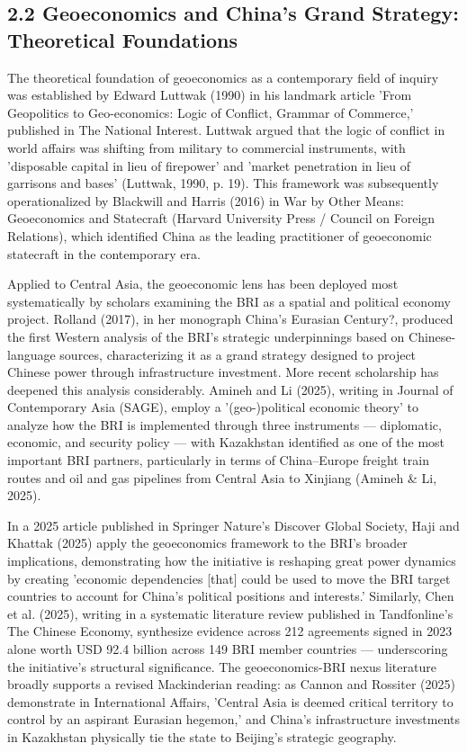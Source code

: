 \documentclass[12pt]{article}
\begin{document}
\subsection{2.2 Geoeconomics and China's Grand Strategy: Theoretical Foundations}
The theoretical foundation of geoeconomics as a contemporary field of inquiry was established by Edward Luttwak (1990) in his landmark article 'From Geopolitics to Geo-economics: Logic of Conflict, Grammar of Commerce,' published in The National Interest. Luttwak argued that the logic of conflict in world affairs was shifting from military to commercial instruments, with 'disposable capital in lieu of firepower' and 'market penetration in lieu of garrisons and bases' (Luttwak, 1990, p. 19). This framework was subsequently operationalized by Blackwill and Harris (2016) in War by Other Means: Geoeconomics and Statecraft (Harvard University Press / Council on Foreign Relations), which identified China as the leading practitioner of geoeconomic statecraft in the contemporary era.\par
Applied to Central Asia, the geoeconomic lens has been deployed most systematically by scholars examining the BRI as a spatial and political economy project. Rolland (2017), in her monograph China's Eurasian Century?, produced the first Western analysis of the BRI's strategic underpinnings based on Chinese-language sources, characterizing it as a grand strategy designed to project Chinese power through infrastructure investment. More recent scholarship has deepened this analysis considerably. Amineh and Li (2025), writing in Journal of Contemporary Asia (SAGE), employ a '(geo-)political economic theory' to analyze how the BRI is implemented through three instruments --- diplomatic, economic, and security policy --- with Kazakhstan identified as one of the most important BRI partners, particularly in terms of China--Europe freight train routes and oil and gas pipelines from Central Asia to Xinjiang (Amineh \& Li, 2025).\par
In a 2025 article published in Springer Nature's Discover Global Society, Haji and Khattak (2025) apply the geoeconomics framework to the BRI's broader implications, demonstrating how the initiative is reshaping great power dynamics by creating 'economic dependencies [that] could be used to move the BRI target countries to account for China's political positions and interests.' Similarly, Chen et al. (2025), writing in a systematic literature review published in Tandfonline's The Chinese Economy, synthesize evidence across 212 agreements signed in 2023 alone worth USD 92.4 billion across 149 BRI member countries --- underscoring the initiative's structural significance. The geoeconomics-BRI nexus literature broadly supports a revised Mackinderian reading: as Cannon and Rossiter (2025) demonstrate in International Affairs, 'Central Asia is deemed critical territory to control by an aspirant Eurasian hegemon,' and China's infrastructure investments in Kazakhstan physically tie the state to Beijing's strategic geography.\par
\end{document}
